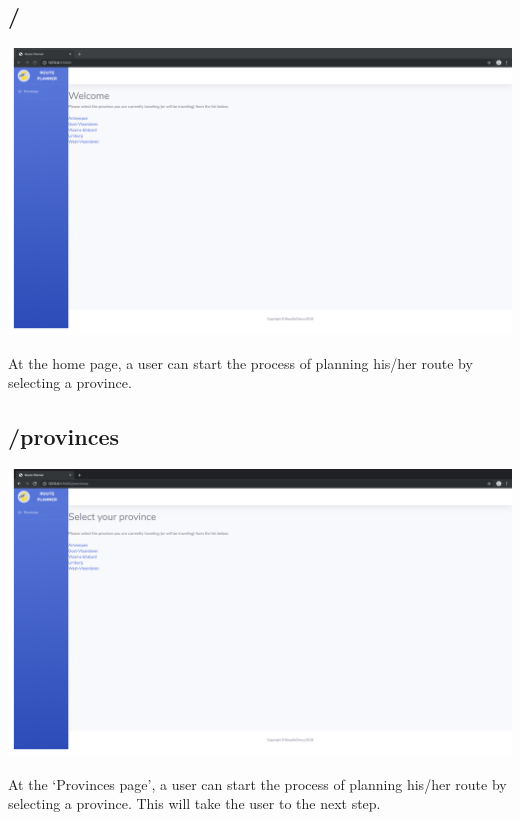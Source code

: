 \documentclass[12pt]{article}
\begin{document}
\subsection{/}
\begin{center}
	\includegraphics[width=\linewidth]{images/Homepage.png}
\end{center}
At the home page, a user can start the process of planning his/her route by selecting a province.

\subsection{/provinces}
\begin{center}
	\includegraphics[width=\linewidth]{images/Select_province.png}
\end{center}
At the \lq Provinces page\rq, a user can start the process of planning his/her route by selecting a province. This will take the user to the next step.
\end{document}
